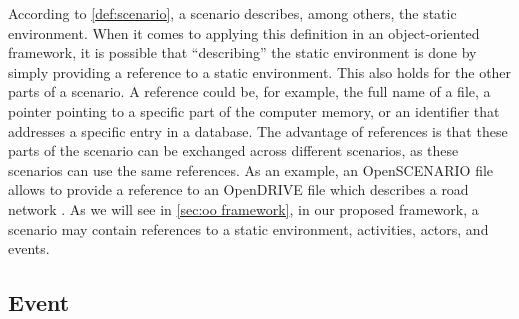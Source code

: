 According to \cref{def:scenario}, a scenario describes, among others, the static environment. 
When it comes to applying this definition in an \cstartb object-oriented framework\cendb, it is possible that ``describing'' the static environment is done by simply providing a reference to a static environment. 
This also holds for the other parts of a scenario. 
A reference could be, for example, the full name of a file, a pointer pointing to a specific part of the computer memory, or an identifier that addresses a specific entry in a database.
The advantage of references is that these parts of the scenario can be exchanged across different scenarios, as these scenarios can use the same references. 
As an example, an OpenSCENARIO file allows to provide a reference to an OpenDRIVE file which describes a road network \autocite{dupuis2010opendrive}. As we will see in \cref{sec:oo framework}, in our proposed \cstartb framework\cendb, a scenario may contain references to a static environment, activities, actors, and events.



\subsection{Event}
\label{sec:event}

